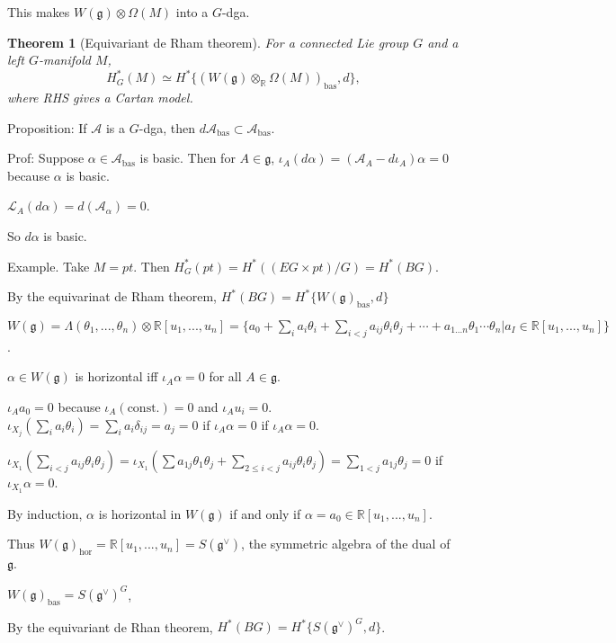 \documentclass{article}
\theoremstyle{mystyle}
\newtheorem*{theorem*}{Theorem}
\theoremstyle{remark}
\numberwithin{equation}{section}
\begin{document}
This makes $W(\mathfrak{g})\otimes \Omega(M)$ into a $G$-\textsf{dga}.


\begin{theorem*}[Equivariant de Rham theorem] For a connected Lie group $G$ and a left $G$-manifold $M$, 
$$H^*_G(M) \simeq H^*\{\left(W(\mathfrak{g})\otimes_{\mathbb{R}} \Omega(M)\right)_{\text{bas}},d\},$$
where RHS gives a \emph{Cartan model}.
\end{theorem*}


Proposition: If $\mathcal{A}$ is a $G$-\textsf{dga}, then $d\mathcal{A}_{\text{bas}} \subset \mathcal{A}_{\text{bas}}$.

Prof: Suppose $\alpha \in \mathcal{A}_{\text{bas}}$ is basic. Then for $A\in \mathfrak{g}$, $\iota_A(d\alpha) = (\mathcal{A}_A - d\iota_A)\alpha = 0$ because $\alpha$ is basic.

$\mathcal{L}_A(d\alpha) = d(\mathcal{A}_\alpha) = 0$. 

So $d\alpha$ is basic.

Example. Take $M = pt$. Then $H^*_G(pt)
=H^*((EG\times pt)/G) = H^*(BG)$. 

By the equivarinat de Rham theorem, $H^*(BG) = H^*\{W(\mathfrak{g})_{\text{bas}},d\}$ 


$W(\mathfrak{g}) = \Lambda(\theta_1,...,\theta_n)\otimes \mathbb{R}[u_1,...,u_n]
=\{a_0+\sum_i a_i\theta_i+\sum_{i<j}a_{ij}\theta_i\theta_j + \cdots + a_{1...n}\theta_1\cdots \theta_n|
a_I\in \mathbb{R}[u_1,...,u_n]\}$.

$\alpha \in W(\mathfrak{g})$ is horizontal iff $\iota_A\alpha = 0$ for all $A\in \mathfrak{g}$.

$\iota_Aa_0 = 0$ because $\iota_A(\text{const.}) = 0$ and $\iota_Au_i = 0$. $ \iota_{X_j}(\sum_i a_i\theta_i) = \sum_i a_i \delta_{ij} = a_j=0$ if $\iota_A\alpha=0$ if $\iota_A \alpha = 0$. 

$\iota_{X_1}(\sum_{i<j}a_{ij}\theta_i\theta_j)
= \iota_{X_1}(\sum a_{1j}\theta_1\theta_j + \sum_{2\leq i<j}a_{ij}\theta_i\theta_j)
= \sum_{1<j} a_{1j}\theta_j = 0$ if $\iota_{X_1}\alpha =0$.

By induction, $\alpha$ is horizontal in $W(\mathfrak{g})$ if and only if $\alpha = a_0 \in \mathbb{R}[u_1,...,u_n]$. 

Thus $W(\mathfrak{g})_{\text{hor}} = 
\mathbb{R}[u_1,...,u_n] = S(\mathfrak{g}^{\vee})$, the symmetric algebra of the dual of $\mathfrak{g}$. 

$W(\mathfrak{g})_{\text{bas}} = S(\mathfrak{g}^{\vee})^G$,

By the equivariant de Rhan theorem, $H^*(BG) = H^*\{S(\mathfrak{g}^{\vee})^G,d\}$.
\end{document}
